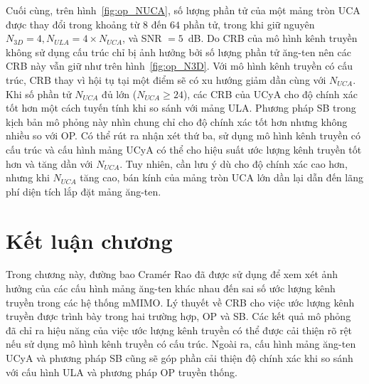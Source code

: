 Cuối cùng, trên hình~\ref{fig:op_NUCA}, số lượng phần tử của một mảng tròn UCA được thay đổi trong khoảng từ $8$ đến $64$ phần tử, trong khi giữ nguyên $N_{3D} = 4, N_{ULA} = 4 \times N_{UCA}$, và SNR $=5$~dB. Do CRB của mô hình kênh truyền không sử dụng cấu trúc chỉ bị ảnh hưởng bởi số lượng phần tử ăng-ten nên các CRB này vẫn giữ như trên hình~\ref{fig:op_N3D}. Với mô hình kênh truyền có cấu trúc, CRB thay vì hội tụ tại một điểm sẽ có xu hướng giảm dần cùng với $N_{UCA}$. Khi số phần tử $N_{UCA}$ đủ lớn ($N_{UCA} \ge 24$), các CRB của UCyA cho độ chính xác tốt hơn một cách tuyến tính khi so sánh với mảng ULA. Phương pháp SB trong kịch bản mô phỏng này nhìn chung chỉ cho độ chính xác tốt hơn nhưng không nhiều so với OP. Có thể rút ra nhận xét thứ ba, sử dụng mô hình kênh truyền có cấu trúc và cấu hình mảng UCyA có thể cho hiệu suất ước lượng kênh truyền tốt hơn và tăng dần với $N_{UCA}$. Tuy nhiên, cần lưu ý dù cho độ chính xác cao hơn, nhưng khi $N_{UCA}$ tăng cao, bán kính của mảng tròn UCA lớn dần lại dẫn đến lãng phí diện tích lắp đặt mảng ăng-ten.

\section{Kết luận chương}
Trong chương này, đường bao Cramér Rao đã được sử dụng để xem xét ảnh hưởng của các cấu hình mảng ăng-ten khác nhau đến sai số ước lượng kênh truyền trong các hệ thống mMIMO. Lý thuyết về CRB cho việc ước lượng kênh truyền được trình bày trong hai trường hợp, OP và SB. Các kết quả mô phỏng đã chỉ ra hiệu năng của việc ước lượng kênh truyền có thể được cải thiện rõ rệt nếu sử dụng mô hình kênh truyền có cấu trúc. Ngoài ra, cấu hình mảng ăng-ten UCyA và phương pháp SB cũng sẽ góp phần cải thiện độ chính xác khi so sánh với cấu hình ULA và phương pháp OP truyền thống.